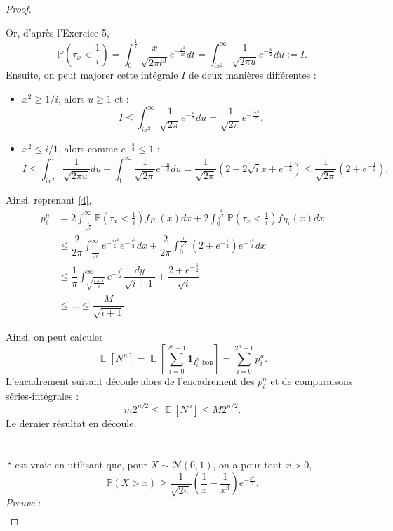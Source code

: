 \documentclass{article}
\theoremstyle{definition}
\numberwithin{equation}{section}
\DeclareMathOperator{\E}{\mathbb{E}}
\begin{document}
\begin{proof}
\begin{itemize}
    Or, d'après l'Exercice 5, 
    $$\mathbb{P}\left(\tau_x<\frac{1}{i}\right)=\int_0^{\frac{1}{i}} \dfrac{x}{\sqrt{2\pi t^3}}e^{-\frac{x^2}{2t}}dt = \int_{ix^2}^\infty \dfrac{1}{\sqrt{2\pi u}}e^{-\frac{u}{2}}du:= I. $$
    Ensuite, on peut majorer cette intégrale $I$ de deux manières différentes :
    \begin{itemize}
        \item[\textbf{si}] $x^2\geq 1/i$, alors $u\geq 1$ et :  
        $$I\leq \int_{ix^2}^\infty \dfrac{1}{\sqrt{2\pi}}e^{-\frac{u}{2}}du =\dfrac{1}{\sqrt{2\pi}}e^{-\frac{ix^2}{2}}. $$
        \item[\textbf{si}] $x^2\leq i/1$, alors comme $e^{-\frac{u}{2}}\leq 1$ :
        $$ I\leq \int_{ix^2}^1\dfrac{1}{\sqrt{2\pi u}}du + \int_1^\infty \dfrac{1}{\sqrt{2\pi}}e^{-\frac{u}{2}}du = \dfrac{1}{\sqrt{2\pi}}(2-2\sqrt{i}x+e^{-\frac{1}{2}}) \leq \dfrac{1}{\sqrt{2\pi}}(2+e^{-\frac{1}{2}}).$$
    \end{itemize}
    Ainsi, reprenant \eqref{4},
    \begin{align*}
        p^n_i &= 2\int_{\frac{1}{\sqrt{i}}}^\infty \mathbb{P}\left(\tau_x<\frac{1}{i}\right)f_{B_1}(x)dx + 2\int_0^{\frac{1}{\sqrt{i}}} \mathbb{P}\left(\tau_x<\frac{1}{i}\right)f_{B_1}(x)dx\\
        &\leq \dfrac{2}{2\pi}\int_{\frac{1}{\sqrt{i}}}^\infty e^{-\frac{ix^2}{2}} e^{-\frac{x^2}{2}}dx + \dfrac{2}{2\pi}\int_0^{\frac{1}{\sqrt{i}}}(2+e^{-\frac{1}{2}})e^{-\frac{x^2}{2}}dx\\
        &\leq \dfrac{1}{\pi}\int_{\sqrt{\frac{i+1}{i}}}^\infty e^{-\frac{y^2}{2}}\dfrac{dy}{\sqrt{i+1}}+\dfrac{2+e^{-\frac{1}{2}}}{\sqrt{i}}\\
        &\leq \dots \leq \dfrac{M}{\sqrt{i+1}} 
    \end{align*}
\end{itemize}
Ainsi, on peut calculer
$$\E[N^n] = \E\left[ \sum_{i=0}^{2^n-1} \mathbf{1}_{I^n_i\text{ bon}} \right] = \sum_{i=0}^{2^n-1} p^n_i. $$
L'encadrement suivant découle alors de l'encadrement des $p^n_i$ et de comparaisons séries-intégrales :
$$ m2^{n/2} \leq \E[N^n] \leq M 2^{n/2}. $$
Le dernier résultat en découle.
~\\~\\~\\
$~^\star$ est vraie en utilisant que, pour $X\sim\mathcal{N}(0,1)$, on a pour tout $x>0$,
$$ \mathbb{P}(X>x)\geq \dfrac{1}{\sqrt{2\pi}}\left( \dfrac{1}{x}-\dfrac{1}{x^3} \right)e^{-\frac{x^2}{2}}. $$
\textit{Preuve} : 
\begin{align*}

\end{align*}
\end{proof}
\end{document}
